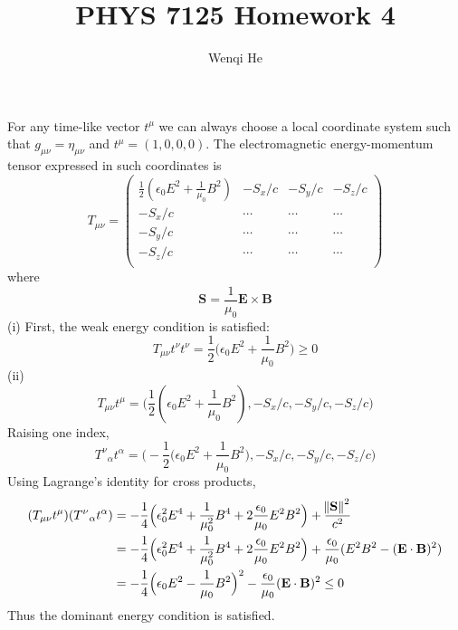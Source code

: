 \documentclass{article}
\title{PHYS 7125 Homework 4}
\author{Wenqi He}
\begin{document}
\maketitle
\section{}
For any time-like vector $t^\mu$ we can always choose a local coordinate system such that $g_{\mu\nu} = \eta_{\mu\nu}$ and $t^\mu = (1,0,0,0)$. The electromagnetic energy-momentum tensor expressed in such coordinates is
\[
	T_{\mu\nu} = \begin{pmatrix}
		\frac{1}{2}(\epsilon_0E^2 + \frac{1}{\mu_0}B^2) & -S_x/c & -S_y/c & -S_z/c\\
		-S_x/c & \cdots & \cdots & \cdots \\
		-S_y/c & \cdots & \cdots & \cdots \\
		-S_z/c & \cdots & \cdots & \cdots \\
	\end{pmatrix}
\]
where \[\mathbf{S} = \frac{1}{\mu_0}\mathbf{E} \times \mathbf{B}\]
(i)
First, the weak energy condition is satisfied:
\[ T_{\mu\nu}t^\nu t^\nu = \frac{1}{2}\Big(\epsilon_0E^2 + \frac{1}{\mu_0}B^2\Big) \geq 0 \]
(ii)
\[ T_{\mu\nu}t^\mu = \Big(\frac{1}{2}(\epsilon_0E^2 + \frac{1}{\mu_0}B^2), -S_x/c, -S_y/c, -S_z/c\Big)\]
Raising one index,
\[ T^\nu{}_{\alpha}t^\alpha = \Big(-\frac{1}{2}\Big(\epsilon_0E^2 + \frac{1}{\mu_0}B^2\Big), -S_x/c, -S_y/c, -S_z/c\Big)\]
Using Lagrange's identity for cross products,
\begin{align*}
(T_{\mu\nu}t^\mu) (T^\nu{}_{\alpha}t^\alpha) &= -\frac{1}{4}\Big(\epsilon_0^2E^4 + \frac{1}{\mu_0^2}B^4 + 2\frac{\epsilon_0}{\mu_0}E^2B^2\Big) + \frac{\norm{\mathbf{S}}^2}{c^2} \\
&= -\frac{1}{4}\Big(\epsilon_0^2E^4 + \frac{1}{\mu_0^2}B^4 + 2\frac{\epsilon_0}{\mu_0}E^2B^2\Big) + \frac{\epsilon_0}{\mu_0} (E^2B^2 - (\mathbf{E}\cdot\mathbf{B})^2) \\
&= -\frac{1}{4}\Big(\epsilon_0E^2 - \frac{1}{\mu_0}B^2\Big)^2 - \frac{\epsilon_0}{\mu_0}(\mathbf{E}\cdot\mathbf{B})^2
\leq 0 \\
\end{align*}
Thus the dominant energy condition is satisfied.
\section{}
\end{document}
